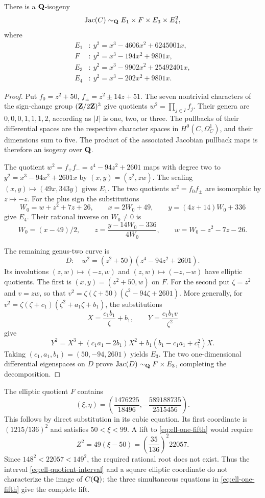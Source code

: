 \begin{proposition}
\label{prop:ell-one-fifth-jacobian}
There is a $\mathbf Q$-isogeny
\[
 \operatorname{Jac}(C)\sim_{\mathbf Q} E_1\times F\times E_3\times E_4^2,
\]
where
\begin{align*}
 E_1&:\ y^2=x^3-4606x^2+6245001x,\\
 F&:\ y^2=x^3-194x^2+9801x,\\
 E_3&:\ y^2=x^3-9902x^2+25492401x,\\
 E_4&:\ y^2=x^3-202x^2+9801x.
\end{align*}
\end{proposition}
\begin{proof}
Put $f_0=z^2+50$, $f_\pm=z^2\pm14z+51$.
The seven nontrivial characters of the sign-change group
$(\mathbf Z/2\mathbf Z)^3$ give quotients $w^2=\prod_{j\in I}f_j$.
Their genera are $0,0,0,1,1,1,2$, according as $|I|$ is one,
two, or three.  The pullbacks of their differential spaces are
the respective character spaces in $H^0(C,\Omega_C^1)$, and
their dimensions sum to five.  The product of the associated
Jacobian pullback maps is therefore an isogeny over $\mathbf Q$.

The quotient $w^2=f_+f_-=z^4-94z^2+2601$ maps with degree two
to $y^2=x^3-94x^2+2601x$ by $(x,y)=(z^2,zw)$.
The scaling $(x,y)\mapsto(49x,343y)$ gives $E_1$.
The two quotients $w^2=f_0f_\pm$ are isomorphic by $z\mapsto-z$.
For the plus sign the substitutions
\[
 W_0=w+z^2+7z+26,\qquad
 x=2W_0+49,\qquad y=(4z+14)W_0+336
\]
give $E_4$.  Their rational inverse on $W_0\ne0$ is
\[
 W_0=(x-49)/2,\qquad
 z=\frac{y-14W_0-336}{4W_0},\qquad
 w=W_0-z^2-7z-26.
\]

The remaining genus-two curve is
\[
 D:\quad w^2=(z^2+50)(z^4-94z^2+2601).
\]
Its involutions $(z,w)\mapsto(-z,w)$ and
$(z,w)\mapsto(-z,-w)$ have elliptic quotients.
The first is $(x,y)=(z^2+50,w)$ on $F$.
For the second put $\zeta=z^2$ and $v=zw$, so that
$v^2=\zeta(\zeta+50)(\zeta^2-94\zeta+2601)$.
More generally, for
$v^2=\zeta(\zeta+c_1)(\zeta^2+a_1\zeta+b_1)$, the substitutions
\[
 X=\frac{c_1b_1}{\zeta}+b_1,\qquad
 Y=\frac{c_1b_1v}{\zeta^2}
\]
give
\[
 Y^2=X^3+(c_1a_1-2b_1)X^2
          +b_1(b_1-c_1a_1+c_1^2)X.
\]
Taking $(c_1,a_1,b_1)=(50,-94,2601)$ yields $E_3$.
The two one-dimensional differential eigenspaces on $D$ prove
$\operatorname{Jac}(D)\sim_\mathbf Q F\times E_3$, completing the decomposition.
\end{proof}

\begin{example}\label{ex:ell-nonlift}
The elliptic quotient $F$ contains
\[
 (\xi,\eta)=\left(
 \frac{1476225}{18496},-\frac{589188735}{2515456}\right).
\]
This follows by direct substitution in its cubic equation.
Its first coordinate is $(1215/136)^2$ and satisfies $50<\xi<99$.
A lift to \eqref{eq:ell-one-fifth} would require
\[
 Z^2=49(\xi-50)=\left(\frac{35}{136}\right)^2 22057.
\]
Since $148^2<22057<149^2$, the required rational root does not exist.
Thus the interval \eqref{eq:ell-quotient-interval} and a square
elliptic coordinate do not characterize the image of $C(\mathbf Q)$;
the three simultaneous equations in \eqref{eq:ell-one-fifth}
give the complete lift.
\end{example}
